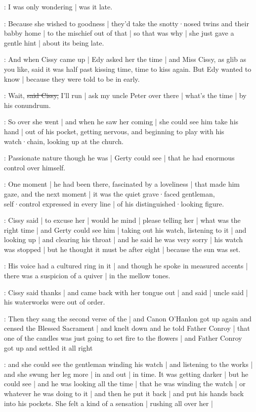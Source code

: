 \gerty:
I was only wondering |
was it late.

\gertyJudgy:
Because she wished to goodness |
they'd take the snotty·nosed twins and their babby home |
to the mischief
out of that |%
so that was why |
she just gave a gentle hint |
about its being late.

:
And when Cissy came up |
Edy asked her the time |
and Miss Cissy,
as glib as you like,
said it was half past kissing time,
time to kiss again.
But Edy wanted to know |
because they were told
to be in early.

\cissy:
Wait,
\sout{said Cissy,}
I'll run |
ask my uncle Peter over there |
what's the time |
by his conundrum.

:
So over she went |
and when he saw her coming |
she could see him take his hand |
out of his pocket,
getting nervous,
and beginning to play with his watch·chain,
looking up at the church.

\gertySex:
Passionate nature though he was |
Gerty could see |
that he had enormous control over himself.%

\gertyNovel:
One moment |
he had been there,
fascinated by a loveliness |
that made him gaze,
and the next moment |
it was the quiet grave·faced gentleman,
self·control expressed in every line |
of his distinguished·looking figure.

:
Cissy said |
to excuse her |
would he mind |
please telling her |
what was the right time |
and Gerty could see him |
taking out his watch,
listening to it |
and looking up |
and clearing his throat |
and he said he was very sorry |
his watch was stopped |
but he thought it must be after eight |
because the sun was set.

\gertyRomantic:
His voice had a cultured ring in it |
and though he spoke in measured accents |
there was a suspicion of a quiver |
in the mellow tones.

:
Cissy said thanks |
and came back with her tongue out |%
and said |
uncle said |
his waterworks were out of order.

\Nrelig:
Then they sang the second verse of the  |
and Canon O'Hanlon got up again
and censed the Blessed Sacrament |
and knelt down
and he told Father Conroy |
that one of the candles
was just going to set fire to the flowers |
and Father Conroy got up
and settled it all right

\gertySex:
and she could see the gentleman
winding his watch |
and listening to the works |
and she swung her leg more |
in and out |
in time.
It was getting darker |
but he could see |
and he was looking all the time |
that he was winding the watch |
or whatever he was doing to it |
and then he put it back |
and put his hands back into his pockets.%
She felt a kind of a sensation |
rushing all over her |

